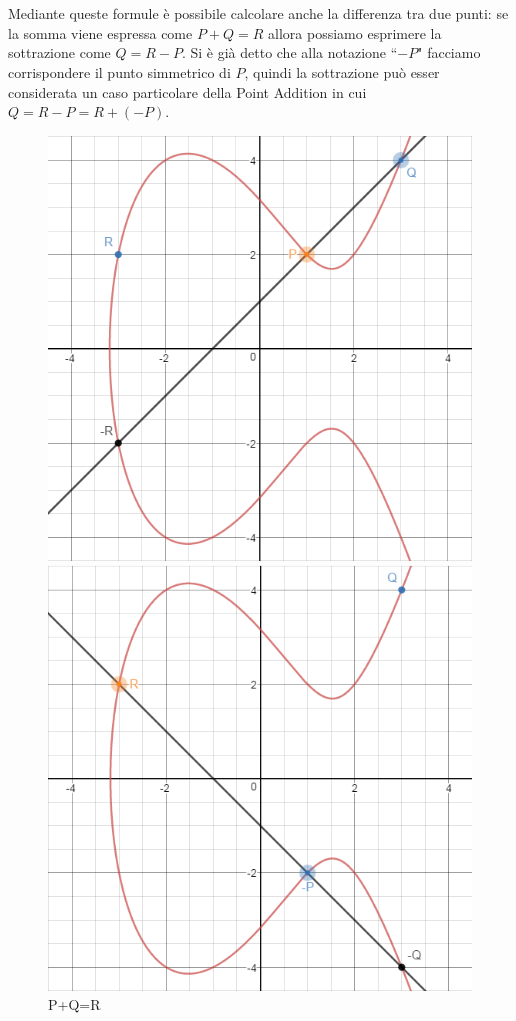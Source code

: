 \documentclass[a4paper,12pt]{tesiinfo}
\begin{document}
\\
\\
Mediante queste formule \`e possibile calcolare anche la differenza tra due punti: se la somma viene espressa come $P+Q=R$ allora possiamo esprimere la sottrazione come $Q=R-P$. Si \`e gi\`a detto che alla notazione ``$-P$" facciamo corrispondere il punto simmetrico di $P$, quindi la sottrazione pu\`o esser considerata un caso particolare della Point Addition in cui $Q=R-P = R + (-P)$.
\begin{figure}[H]
 \begin{minipage}[H]{0.5\textwidth}
  \includegraphics[width=\textwidth, left]{PQR+}
  \caption{P+Q=R}
  \label{PQR+}
 \end{minipage}
 \begin{minipage}[H]{0.5\textwidth}
  \includegraphics[width=\textwidth, right]{PQR-}

\end{minipage}
\end{figure}
\end{document}
